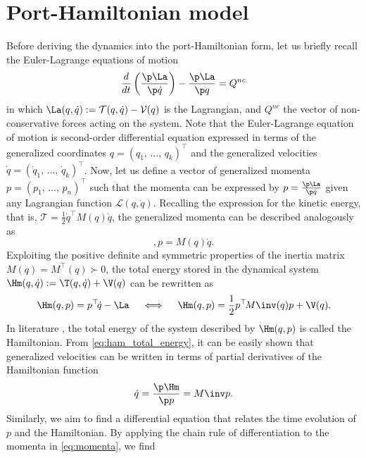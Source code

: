 \clearpage
\section{Port-Hamiltonian model}
Before deriving the dynamics into the port-Hamiltonian form, let us briefly recall the Euler-Lagrange equations of motion 
\begin{equation}
\frac{d}{dt} \left( \frac{\p \La}{ \p \dot{q}} \right) - \frac{\p \La}{\p q} = Q^{nc}
\end{equation}
in which $\La(q,\dot{q}) := \mathcal{T}(q,\dot{q}) - \mathcal{V}(q)$ is the Lagrangian, and $Q^{nc}$ the vector of non-conservative forces acting on the system. Note that the Euler-Lagrange equation of motion is second-order differential equation expressed in terms of the generalized coordinates $q = (q_1,\,...,\,q_k)^\top$ and the generalized velocities $\dot{q} = (\dot{q}_1,\,...,\,\dot{q}_k)^\top$. Now, let us define a vector of generalized momenta $p = (p_1,\,...,\,p_n)^\top$ such that the momenta can be expressed by $p = \frac{\p \La}{\p \dot{q}}$ given any Lagrangian function $\mathcal{L}(q,\dot{q})$. Recalling the expression for the kinetic energy, that is, $\mathcal{T} = \frac{1}{2}\dot{q}^\top M(q) \dot{q}$, the generalized momenta can be described analogously as
%
\begin{equation},
p = M(q) \dot{q}. \label{eq:momenta}
\end{equation}
%
Exploiting the positive definite and symmetric properties of the inertia matrix $M(q) = M^\top(q) \succ 0$, the total energy stored in the dynamical system $\Hm(q,\dot{q})  := \T(q,\dot{q}) + \V(q)$ can be rewritten as
\begin{equation}
\Hm (q,p) = p^\top \!\dot{q} - \La \quad \iff  \quad \Hm (q,p) = \frac{1}{2}p^\top \! M\inv(q)p + \V(q). \label{eq:ham_total_energy}
\end{equation}
In literature \cite{Schaft2004,Spong1996,Ortega2002}, the total energy of the system described by $\Hm (q,p)$ is called the Hamiltonian. From \eqref{eq:ham_total_energy}, it can be easily shown that generalized velocities can be written in terms of partial derivatives of the Hamiltonian function
%
\begin{equation}
\dot{q} = \frac{\p \Hm}{\p p} = M\inv p.
\end{equation}
%
Similarly, we aim to find a differential equation that relates the time evolution of ${p}$ and the Hamiltonian. By applying the chain rule of differentiation to the momenta in \eqref{eq:momenta}, we find
